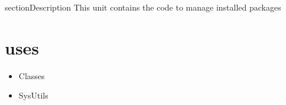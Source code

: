 \documentclass{report}
\begin{document}
section{Description}
This unit contains the code to manage installed packages
\section{uses}
\begin{itemize}
\item \begin{ttfamily}Classes\end{ttfamily}\item \begin{ttfamily}SysUtils\end{ttfamily}
\end{itemize}
\end{document}
